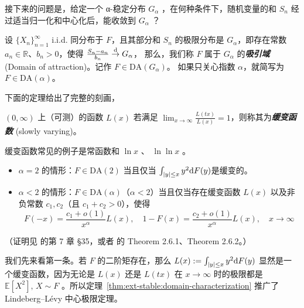 接下来的问题是，给定一个 α-稳定分布 $G_\alpha$ ，在何种条件下，随机变量的和 $S_n$ 经过适当归一化和中心化后，能收敛到 $G_\alpha$ ？

\begin{definition*}[吸引域]
设 $\{X_n\}_{n=1}^\infty$ i.i.d. 同分布于 $F$，且其部分和 $S_n$ 的极限分布是 $G_\alpha$，即存在常数 $a_n\in\mathbb R$、$b_n>0$，使得 $\frac{S_n-a_n}{b_n}\overset{\rm d}\to G_\alpha$，
那么，我们称 $F$ 属于 $G_\alpha$ 的\textbf{\emph{吸引域}} (Domain of attraction)。记作 $F \in \mathrm{DA}(G_\alpha)$。 如果只关心指数 $\alpha$，就简写为 $F \in \mathrm{DA}(\alpha)$。
\end{definition*}

下面的定理给出了完整的刻画，

\begin{definition*}[缓变函数]
$(0,\infty)$ 上（可测）的函数 $L(x)$ 若满足 $\lim_{x\to\infty}\frac{L(tx)}{L(x)}=1$，则称其为\textbf{\emph{缓变函数}} (slowly varying)。
\end{definition*}

缓变函数常见的例子是常函数和 $\ln x$ 、 $\ln\ln x$ 。


\begin{theorem}[吸引域的刻画]
\label{thm:ext-stable:domain-characterization}

\begin{itemize}
\tightlist
\item
  $\alpha = 2$ 的情形：$F \in \mathrm{DA}(2)$ 当且仅当 $\int_{|y| \le x} y^2 {\rm d}F(y)$是缓变的。
\item
  $\alpha < 2$ 的情形：$F \in \mathrm{DA}(\alpha)$（$\alpha < 2$）当且仅当存在缓变函数 $L(x)$ 以及非负常数 $c_1, c_2$（且 $c_1 + c_2 > 0$），使得\[ F(-x) = \frac{c_1 + o(1)}{x^\alpha} L(x), \quad 1 - F(x) = \frac{c_2 + o(1)}{x^\alpha} L(x), \quad x \to \infty \]
\end{itemize}

\end{theorem}

（证明见 \cite{gnedenko1954} 的第 7 章 §35，或者 \cite{ibragimov1971} 的 Theorem 2.6.1、Theorem 2.6.2。）


我们先来看第一条。若 $F$ 的二阶矩存在，那么 $L(x):=\int_{|y| \le x} y^2 {\rm d}F(y)$ 显然是一个缓变函数，因为无论是 $L(x)$ 还是 $L(tx)$ 在 $x\to\infty$ 时的极限都是 $\mathbb E[X^2],\,X\sim F$ 。所以定理~\ref{thm:ext-stable:domain-characterization} 推广了 Lindeberg--Lévy 中心极限定理。

